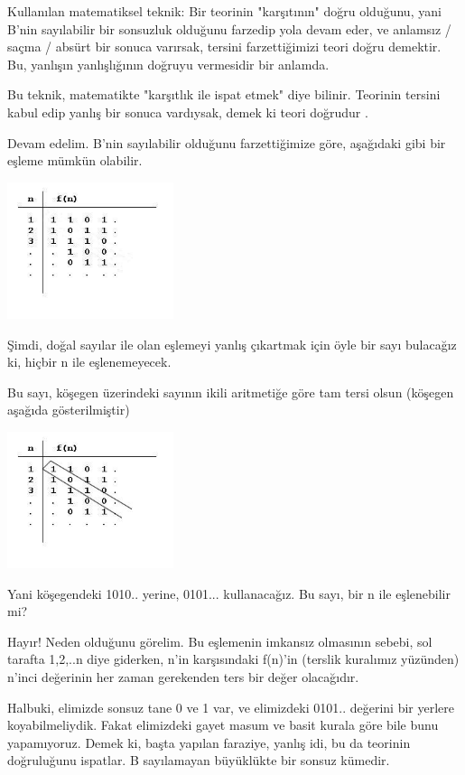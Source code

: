 \documentclass[12pt,fleqn]{article}\usepackage{../../common}
\begin{document}
Kullanılan matematiksel teknik: Bir teorinin "karşıtının" doğru olduğunu, yani
B'nin sayılabilir bir sonsuzluk olduğunu farzedip yola devam eder, ve anlamsız /
saçma / absürt bir sonuca varırsak, tersini farzettiğimizi teori doğru
demektir. Bu, yanlışın yanlışlığının doğruyu vermesidir bir anlamda.

Bu teknik, matematikte "karşıtlık ile ispat etmek" diye bilinir. Teorinin
tersini kabul edip yanlış bir sonuca vardıysak, demek ki teori doğrudur .

Devam edelim. B'nin sayılabilir olduğunu farzettiğimize göre, aşağıdaki
gibi bir eşleme mümkün olabilir.

\includegraphics[height=4cm]{inf_binary_diagonalization_once.jpg}

Şimdi, doğal sayılar ile olan eşlemeyi yanlış çıkartmak için öyle bir sayı
bulacağız ki, hiçbir n ile eşlenemeyecek.

Bu sayı, köşegen üzerindeki sayının ikili aritmetiğe göre tam tersi olsun
(köşegen aşağıda gösterilmiştir)

\includegraphics[height=4cm]{inf_binary_diagonalization.jpg}

Yani köşegendeki 1010.. yerine, 0101... kullanacağız. Bu sayı, bir n ile
eşlenebilir mi?

Hayır! Neden olduğunu görelim. Bu eşlemenin imkansız olmasının sebebi, sol
tarafta 1,2,..n diye giderken, n'in karşısındaki f(n)'in (terslik kuralımız
yüzünden) n'inci değerinin her zaman gerekenden ters bir değer olacağıdır.

Halbuki, elimizde sonsuz tane 0 ve 1 var, ve elimizdeki 0101.. değerini bir
yerlere koyabilmeliydik. Fakat elimizdeki gayet masum ve basit kurala göre
bile bunu yapamıyoruz. Demek ki, başta yapılan faraziye, yanlış idi, bu da
teorinin doğruluğunu ispatlar. B sayılamayan büyüklükte bir sonsuz kümedir.
\end{document}
